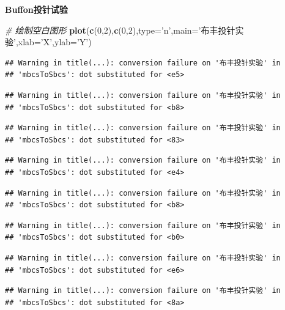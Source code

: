 \documentclass[]{article}
\newenvironment{Shaded}{\begin{snugshade}}{\end{snugshade}}
\newcommand{\KeywordTok}[1]{\textcolor[rgb]{0.13,0.29,0.53}{\textbf{{#1}}}}
\newcommand{\DataTypeTok}[1]{\textcolor[rgb]{0.13,0.29,0.53}{{#1}}}
\newcommand{\DecValTok}[1]{\textcolor[rgb]{0.00,0.00,0.81}{{#1}}}
\newcommand{\StringTok}[1]{\textcolor[rgb]{0.31,0.60,0.02}{{#1}}}
\newcommand{\CommentTok}[1]{\textcolor[rgb]{0.56,0.35,0.01}{\textit{{#1}}}}
\newcommand{\NormalTok}[1]{{#1}}
\begin{document}
\textbf{Buffon投针试验}

\begin{Shaded}
\begin{Highlighting}[]
\CommentTok{# 绘制空白图形}
\KeywordTok{plot}\NormalTok{(}\KeywordTok{c}\NormalTok{(}\DecValTok{0}\NormalTok{,}\DecValTok{2}\NormalTok{),}\KeywordTok{c}\NormalTok{(}\DecValTok{0}\NormalTok{,}\DecValTok{2}\NormalTok{),}\DataTypeTok{type=}\StringTok{'n'}\NormalTok{,}\DataTypeTok{main=}\StringTok{'布丰投针实验'}\NormalTok{,}\DataTypeTok{xlab=}\StringTok{'X'}\NormalTok{,}\DataTypeTok{ylab=}\StringTok{'Y'}\NormalTok{)}
\end{Highlighting}
\end{Shaded}

\begin{verbatim}
## Warning in title(...): conversion failure on '布丰投针实验' in
## 'mbcsToSbcs': dot substituted for <e5>
\end{verbatim}

\begin{verbatim}
## Warning in title(...): conversion failure on '布丰投针实验' in
## 'mbcsToSbcs': dot substituted for <b8>
\end{verbatim}

\begin{verbatim}
## Warning in title(...): conversion failure on '布丰投针实验' in
## 'mbcsToSbcs': dot substituted for <83>
\end{verbatim}

\begin{verbatim}
## Warning in title(...): conversion failure on '布丰投针实验' in
## 'mbcsToSbcs': dot substituted for <e4>
\end{verbatim}

\begin{verbatim}
## Warning in title(...): conversion failure on '布丰投针实验' in
## 'mbcsToSbcs': dot substituted for <b8>
\end{verbatim}

\begin{verbatim}
## Warning in title(...): conversion failure on '布丰投针实验' in
## 'mbcsToSbcs': dot substituted for <b0>
\end{verbatim}

\begin{verbatim}
## Warning in title(...): conversion failure on '布丰投针实验' in
## 'mbcsToSbcs': dot substituted for <e6>
\end{verbatim}

\begin{verbatim}
## Warning in title(...): conversion failure on '布丰投针实验' in
## 'mbcsToSbcs': dot substituted for <8a>
\end{verbatim}
\end{document}
